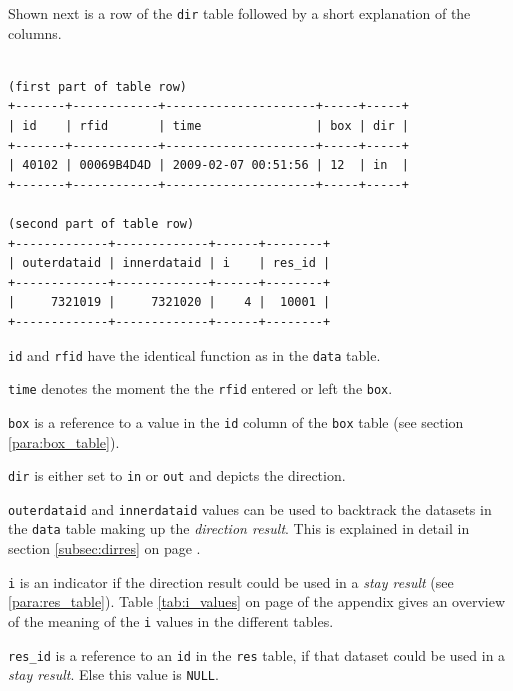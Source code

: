 Shown next is a row of the \lstinline|dir| table followed by a short explanation of the columns.

\codescript
{}
\begin{lstlisting}[frame=none]

(first part of table row)
+-------+------------+---------------------+-----+-----+
| id    | rfid       | time                | box | dir |
+-------+------------+---------------------+-----+-----+
| 40102 | 00069B4D4D | 2009-02-07 00:51:56 | 12  | in  |
+-------+------------+---------------------+-----+-----+

(second part of table row)
+-------------+-------------+------+--------+
| outerdataid | innerdataid | i    | res_id |
+-------------+-------------+------+--------+
|     7321019 |     7321020 |    4 |  10001 | 
+-------------+-------------+------+--------+
\end{lstlisting}

\begin{mydesc}
  \item \lstinline|id| and \lstinline|rfid| have the identical function as in the \lstinline|data| table.
  \item \lstinline|time| denotes the moment the the \lstinline|rfid| entered or left the \lstinline|box|.
  \item \lstinline|box| is a reference to a value in the \lstinline|id| column of the \lstinline|box| table (see section \ref{para:box_table}).
  \item \lstinline|dir| is either set to \lstinline|in| or \lstinline|out| and depicts the direction.
  \item \lstinline|outerdataid| and \lstinline|innerdataid| values can be used to backtrack the datasets in the \lstinline|data| table making up the \textit{direction result}. This is explained in detail in section \ref{subsec:dirres} on page \pageref{subsec:dirres}.
  \item \lstinline|i| is an indicator if the direction result could be used in a \textit{stay result} (see \ref{para:res_table}). Table \ref{tab:i_values} on page \pageref{tab:i_values} of the appendix gives an overview of the meaning of the \lstinline|i| values in the different tables.
  \item \lstinline|res_id| is a reference to an \lstinline|id| in the \lstinline|res| table, if that dataset could be used in a \textit{stay result}. Else this value is \lstinline|NULL|.
\end{mydesc}

